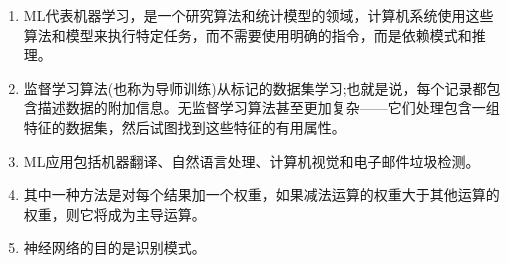\begin{enumerate}
	\item ML代表机器学习，是一个研究算法和统计模型的领域，计算机系统使用这些算法和模型来执行特定任务，而不需要使用明确的指令，而是依赖模式和推理。
	\item 监督学习算法(也称为导师训练)从标记的数据集学习;也就是说，每个记录都包含描述数据的附加信息。无监督学习算法甚至更加复杂——它们处理包含一组特征的数据集，然后试图找到这些特征的有用属性。
	\item ML应用包括机器翻译、自然语言处理、计算机视觉和电子邮件垃圾检测。
	\item 其中一种方法是对每个结果加一个权重，如果减法运算的权重大于其他运算的权重，则它将成为主导运算。
	\item 神经网络的目的是识别模式。 
\end{enumerate}













